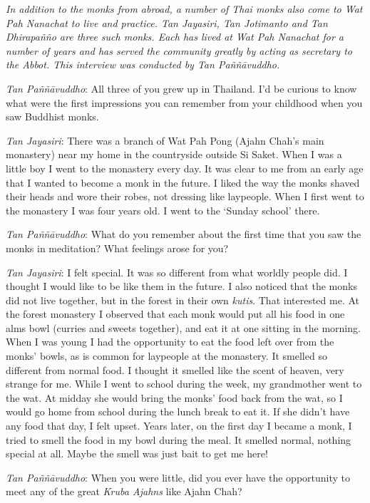 
\emph{In addition to the monks from abroad, a number of Thai monks also
come to Wat Pah Nanachat to live and practice. Tan Jayasiri, Tan
Jotimanto and Tan Dhirapañño are three such monks. Each has lived at Wat
Pah Nanachat for a number of years and has served the community greatly
by acting as secretary to the Abbot. This interview was conducted by Tan
Paññāvuddho.}

\emph{Tan Paññāvuddho}: All three of you grew up in Thailand. I'd be
curious to know what were the first impressions you can remember from
your childhood when you saw Buddhist monks.

\emph{Tan Jayasiri}: There was a branch of Wat Pah Pong (Ajahn Chah's
main monastery) near my home in the countryside outside Si Saket. When I
was a little boy I went to the monastery every day. It was clear to me
from an early age that I wanted to become a monk in the future. I liked
the way the monks shaved their heads and wore their robes, not dressing
like laypeople. When I first went to the monastery I was four years old.
I went to the `Sunday school' there.

\emph{Tan Paññāvuddho}: What do you remember about the first time that
you saw the monks in meditation? What feelings arose for you?

\emph{Tan Jayasiri}: I felt special. It was so different from what
worldly people did. I thought I would like to be like them in the
future. I also noticed that the monks did not live together, but in the
forest in their own \emph{kutis}. That interested me. At the forest
monastery I observed that each monk would put all his food in one alms
bowl (curries and sweets together), and eat it at one sitting in the
morning. When I was young I had the opportunity to eat the food left
over from the monks' bowls, as is common for laypeople at the monastery.
It smelled so different from normal food. I thought it smelled like the
scent of heaven, very strange for me. While I went to school during the
week, my grandmother went to the wat. At midday she would bring the
monks' food back from the wat, so I would go home from school during the
lunch break to eat it. If she didn't have any food that day, I felt
upset. Years later, on the first day I became a monk, I tried to smell
the food in my bowl during the meal. It smelled normal, nothing special
at all. Maybe the smell was just bait to get me here!

\emph{Tan Paññāvuddho}‎: When you were little, did you ever have the
opportunity to meet any of the great \emph{Kruba Ajahns‎‎} like Ajahn
Chah?

